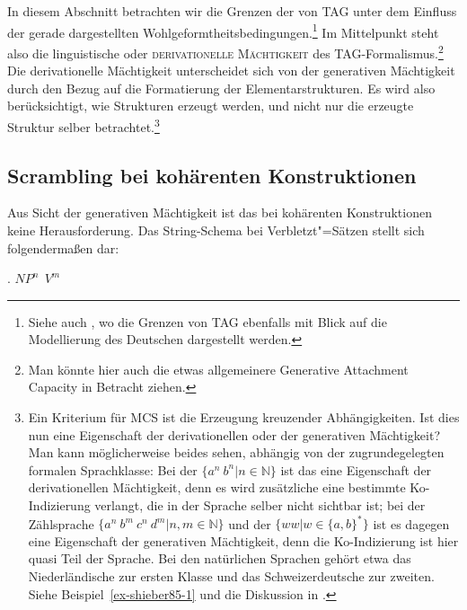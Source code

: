 In diesem Abschnitt betrachten wir die Grenzen der  von TAG unter dem Einfluss der gerade dargestellten Wohlgeformtheitsbedingungen.\footnote{Siehe auch \citet[Abschnitt~2.4]{Gerdes:02b}, wo die Grenzen von TAG ebenfalls mit Blick auf die Modellierung des Deutschen dargestellt werden.} Im Mittelpunkt steht also die linguistische oder \textsc{derivationelle Mächtigkeit}  \citep{Becker:Rambow:Niv:92} des TAG-Formalis\-mus.\footnote{Man könnte hier auch die etwas allgemeinere Generative Attachment Capacity \citep{Kallmeyer:06} in Betracht ziehen.} Die derivationelle Mächtigkeit unterscheidet sich von der generativen Mächtigkeit durch den Bezug auf die Formatierung der Elementarstrukturen. Es wird also berücksichtigt, wie Strukturen erzeugt werden, und nicht nur die erzeugte Struktur selber betrachtet.\footnote{Ein Kriterium für MCS ist die Erzeugung kreuzender Abhängigkeiten. Ist dies nun eine Eigenschaft der derivationellen oder der generativen Mächtigkeit? Man kann möglicherweise beides sehen, abhängig von der zugrundegelegten formalen Sprachklasse: Bei der  $\{a^n ~ b^n | n \in \mathbb{N}\}$ ist das eine Eigenschaft der derivationellen Mächtigkeit, denn es wird zusätzliche eine bestimmte Ko-Indizierung verlangt, die in der Sprache selber nicht sichtbar ist; bei der Zählsprache $\{a^n ~ b^m ~ c^n ~ d^m | n,m \in \mathbb{N}\}$ und der  $\{ww|w\in\{a,b\}^*\}$ ist es dagegen eine Eigenschaft der generativen Mächtigkeit, denn die Ko-Indizierung ist hier quasi Teil der Sprache. Bei den natürlichen Sprachen gehört etwa das Niederländische zur ersten Klasse und das Schweizerdeutsche zur zweiten. Siehe Beispiel~\ref{ex-shieber85-1} und die Diskussion in \cite{Shieber:85}.} 

\subsection{Scrambling bei kohärenten Konstruktionen} \label{sec-tag-grenzen-scram}

Aus Sicht der generativen Mächtigkeit ist das  bei kohärenten Konstruktionen keine Herausforderung. Das String-Schema bei Verbletzt"=Sätzen \linebreak stellt sich folgenderma\ss en dar:

\ex. $\mathit{NP}^n ~~ V^m$

